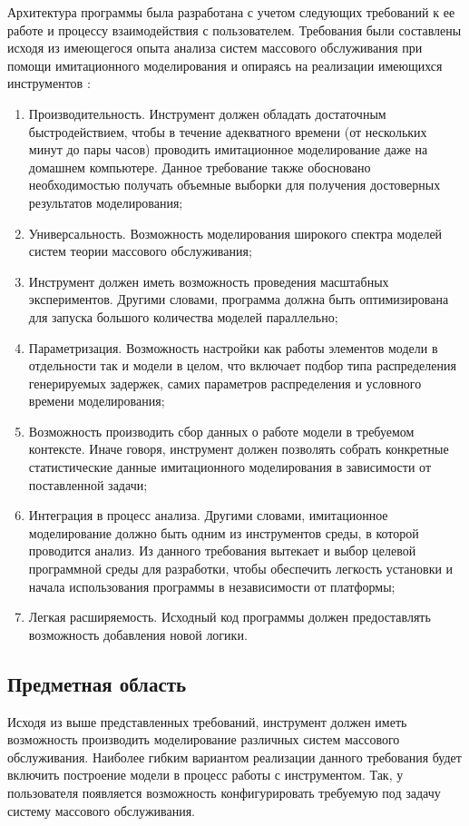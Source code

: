 Архитектура программы была разработана с учетом следующих требований к ее работе и процессу взаимодействия с пользователем. Требования были составлены исходя из имеющегося опыта анализа систем массового обслуживания при помощи имитационного моделирования и опираясь на реализации имеющихся инструментов \cite{yakimov2017comparison}:
\begin{enumerate}
	\item Производительность. Инструмент должен обладать достаточным быстродействием, чтобы в течение адекватного времени (от нескольких минут до пары часов) проводить имитационное моделирование даже на домашнем компьютере. Данное требование также обосновано необходимостью получать объемные выборки для получения достоверных результатов моделирования;
	\item Универсальность. Возможность моделирования широкого спектра моделей систем теории массового обслуживания;
	\item Инструмент должен иметь возможность проведения масштабных экспериментов. Другими словами, программа должна быть оптимизирована для запуска большого количества моделей параллельно;
	\item Параметризация. Возможность настройки как работы элементов модели в отдельности так и модели в целом, что включает подбор типа распределения генерируемых задержек, самих параметров распределения и условного времени моделирования;
	\item Возможность производить сбор данных о работе модели в требуемом контексте. Иначе говоря, инструмент должен позволять собрать конкретные статистические данные имитационного моделирования в зависимости от поставленной задачи;
	\item Интеграция в процесс анализа. Другими словами, имитационное моделирование должно быть одним из инструментов среды, в которой проводится анализ. Из данного требования вытекает и выбор целевой программной среды для разработки, чтобы обеспечить легкость установки и начала использования программы в независимости от платформы;
	\item Легкая расширяемость. Исходный код программы должен предоставлять возможность добавления новой логики.
\end{enumerate}

\subsection{Предметная область}
Исходя из выше представленных требований, инструмент должен иметь возможность производить моделирование различных систем массового обслуживания. Наиболее гибким вариантом реализации данного требования будет включить построение модели в процесс работы с инструментом. Так, у пользователя появляется возможность конфигурировать требуемую под задачу систему массового обслуживания.

